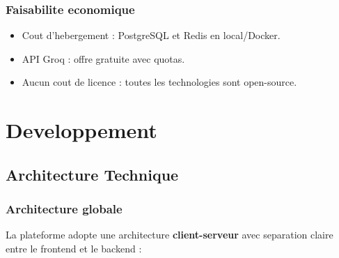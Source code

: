 \documentclass[12pt,a4paper]{report}
\begin{document}
\section{Faisabilite economique}

\begin{itemize}
  \item Cout d'hebergement : PostgreSQL et Redis en local/Docker.
  \item API Groq : offre gratuite avec quotas.
  \item Aucun cout de licence : toutes les technologies sont open-source.
\end{itemize}

\part{Developpement}

\chapter{Architecture Technique}

\section{Architecture globale}

La plateforme adopte une architecture \textbf{client-serveur} avec separation claire entre le frontend et le backend :
\end{document}
